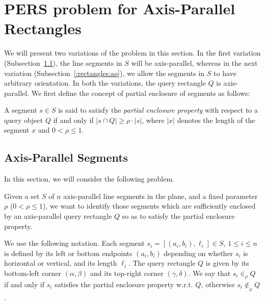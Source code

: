 \section{PERS problem for Axis-Parallel Rectangles}
\label{:rectangles}


We will present two variations of the \PERS{} problem in this section. 
In the first variation (Subsection~\ref{:rectangles:ap}), the line 
segments in $S$ will  be axis-parallel, whereas in the next variation 
(Subsection~\ref{:rectangles:ao}), we allow the segments in $S$ to have 
arbitrary orientation. In both the variations, the query rectangle $Q$ 
is axis-parallel. We first define the concept of partial enclosure of 
segments as follows:


\begin{definition}
A segment $s \in S$ is said to satisfy the {\em partial enclosure 
property} with respect to a query object $Q$ if and only if 
$|s \cap Q| \geq \rho \cdot |s|$, where $|x|$ denotes the length 
of the segment $x$ and $0 < \rho\leq 1$.
\end{definition}


\subsection{Axis-Parallel Segments}
\label{:rectangles:ap}
In this section, we will consider the following problem. 


\begin{problem}
Given a set $S$ of $n$ axis-parallel line segments in the plane, 
and a fixed parameter $\rho$ ($0 < \rho \leq 1$), we want to 
identify those segments which are sufficiently enclosed by 
an axis-parallel query rectangle $Q$ so as to satisfy the 
partial enclosure property. 
\end{problem}

We use the following notation. Each segment 
$s_i =[(a_i,b_i), \ell_i] \in S$, $1 \leq i \leq n$ is defined 
by its left or bottom endpoints $(a_i, b_i)$ depending on whether 
$s_i$ is horizontal or vertical, and its length $\ell_i$. 
The query rectangle $Q$ is given by its bottom-left corner $(\alpha, 
\beta)$ and its top-right corner $(\gamma, \delta)$.  We say that $s_i \in_\rho Q$ if and only 
if $s_i$ satisfies the partial enclosure property w.r.t. $Q$, 
otherwise $s_i \not \in_\rho Q$. 



